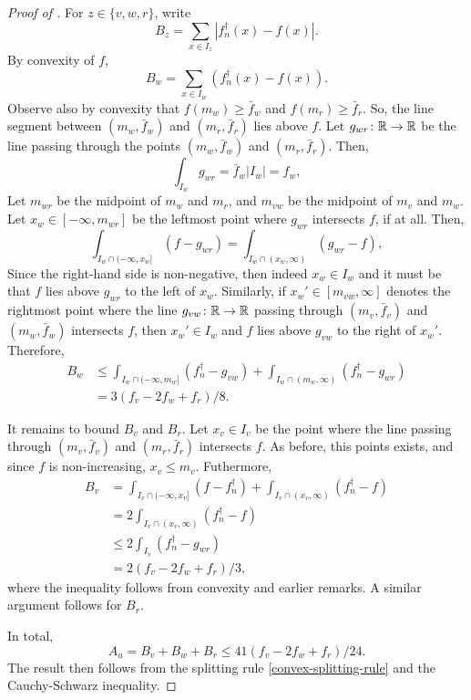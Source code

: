 \begin{proof}[Proof of ]
  For $z \in \{v, w, r\}$, write
  \[
    B_z = \sum_{x \in I_z} |f^\dagger_n(x) - f(x)| .
  \]
  By convexity of $f$,
  \[
    B_w = \sum_{x \in I_w} (f^\dagger_n(x) - f(x)) .
  \]
  Observe also by convexity that $f(m_w) \ge \bar{f}_w$ and
  $f(m_r) \ge \bar{f}_r$. So, the line segment between
  $(m_w, \bar{f}_w)$ and $(m_r, \bar{f}_r)$ lies above $f$. Let
  $g_{wr} \colon \mathbb{R} \to \mathbb{R}$ be the line passing through the points
  $(m_w, \bar{f}_w)$ and $(m_r, \bar{f}_r)$. Then,
  \[
    \int_{I_w} g_{wr} = \bar{f}_w |I_w| = f_w ,
  \]
  Let $m_{wr}$ be the midpoint of $m_w$ and $m_r$, and $m_{vw}$ be the
  midpoint of $m_v$ and $m_w$. Let $x_w \in [-\infty, m_{wr}]$ be the
  leftmost point where $g_{wr}$ intersects $f$, if at all. Then,
  \[
    \int_{I_w \cap (-\infty, x_w]} (f - g_{wr}) = \int_{I_w \cap (x_w, \infty)} (g_{wr} - f),
  \]
  Since the right-hand side is non-negative, then indeed $x_w \in I_w$
  and it must be that $f$ lies above $g_{wr}$ to the left of
  $x_w$. Similarly, if $x_w' \in [m_{vw}, \infty]$ denotes the
  rightmost point where the line $g_{vw} \colon \mathbb{R} \to \mathbb{R}$ passing
  through $(m_v, \bar{f}_v)$ and $(m_w, \bar{f}_w)$ intersects $f$,
  then $x_w' \in I_w$ and $f$ lies above $g_{vw}$ to the right of
  $x_w'$. Therefore,
  \begin{align*}
    B_w &\le \int_{I_w \cap (-\infty, m_w]} (f^\dagger_n - g_{vw}) + \int_{I_w \cap (m_w, \infty)} (f^\dagger_n - g_{wr}) \\
        &= 3(f_v - 2 f_w + f_r)/8 .
  \end{align*}

  It remains to bound $B_v$ and $B_r$. Let $x_v \in I_v$ be the point
  where the line passing through $(m_v, \bar{f}_v)$ and
  $(m_r, \bar{f}_r)$ intersects $f$. As before, this points exists,
  and since $f$ is non-increasing, $x_v \le m_v$. Futhermore,
  \begin{align*}
    B_v &= \int_{I_v \cap (-\infty, x_v]} (f - f^\dagger_n) + \int_{I_v \cap (x_v, \infty)} (f^\dagger_n - f) \\
        &= 2 \int_{I_v \cap (x_v, \infty)} (f^\dagger_n - f) \\
        &\le 2 \int_{I_v} (f^\dagger_n - g_{wr}) \\
        &= 2(f_v - 2f_w + f_r)/3 ,
  \end{align*}
  where the inequality follows from convexity and earlier remarks. A
  similar argument follows for $B_r$.

  In total,
  \[
    A_u = B_v + B_w + B_r \le 41(f_v - 2 f_w + f_r)/24 .
  \]
  The result then follows from the splitting rule
  \eqref{convex-splitting-rule} and the Cauchy-Schwarz inequality.
\end{proof}

